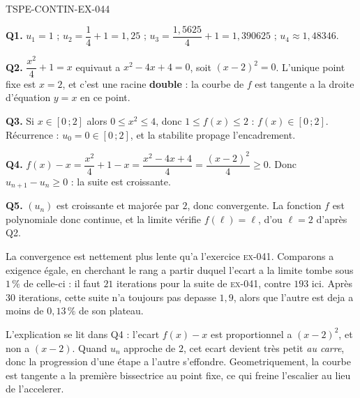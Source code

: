 \begin{corrige}{TSPE-CONTIN-EX-044}

\textbf{Q1.} $u_1 = 1$ ; $u_2 = \dfrac{1}{4} + 1 = 1{,}25$ ; $u_3 = \dfrac{1{,}5625}{4} + 1 = 1{,}390625$ ; $u_4 \approx 1{,}48346$.

\textbf{Q2.} $\dfrac{x^2}{4} + 1 = x$ equivaut a $x^2 - 4x + 4 = 0$, soit $(x-2)^2 = 0$. L'unique point fixe est $x = 2$, et c'est une racine \textbf{double} : la courbe de $f$ est tangente a la droite d'équation $y = x$ en ce point.

\textbf{Q3.} Si $x \in [0\,;2]$ alors $0 \leq x^2 \leq 4$, donc $1 \leq f(x) \leq 2$ : $f(x) \in [0\,;2]$. Récurrence : $u_0 = 0 \in [0\,;2]$, et la stabilite propage l'encadrement.

\textbf{Q4.} $f(x) - x = \dfrac{x^2}{4} + 1 - x = \dfrac{x^2 - 4x + 4}{4} = \dfrac{(x-2)^2}{4} \geq 0$. Donc $u_{n+1} - u_n \geq 0$ : la suite est croissante.

\textbf{Q5.} $(u_n)$ est croissante et majorée par $2$, donc convergente. La fonction $f$ est polynomiale donc continue, et la limite vérifie $f(\ell) = \ell$, d'ou $\ell = 2$ d'après Q2.

La convergence est nettement plus lente qu'a l'exercice \textsc{ex-041}. Comparons a exigence égale, en cherchant le rang a partir duquel l'ecart a la limite tombe sous $1\,\%$ de celle-ci : il faut $21$ iterations pour la suite de \textsc{ex-041}, contre $193$ ici. Après $30$ iterations, cette suite n'a toujours pas depasse $1{,}9$, alors que l'autre est deja a moins de $0{,}13\,\%$ de son plateau.

L'explication se lit dans Q4 : l'ecart $f(x) - x$ est proportionnel a $(x-2)^2$, et non a $(x-2)$. Quand $u_n$ approche de $2$, cet ecart devient très petit \emph{au carre}, donc la progression d'une étape a l'autre s'effondre. Geometriquement, la courbe est tangente a la première bissectrice au point fixe, ce qui freine l'escalier au lieu de l'accelerer.
\end{corrige}
